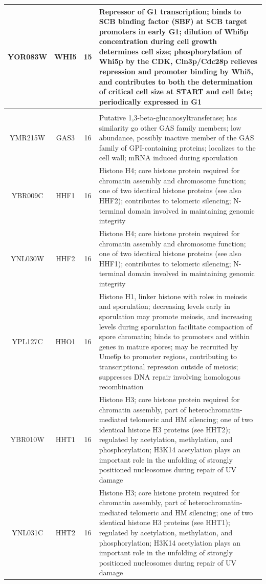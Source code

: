 \documentclass[]{article}
\begin{document}
\begin{longtable}{@{\extracolsep{3pt}} cccp{85mm}}
YOR083W & WHI5 & 15 & Repressor of G1 transcription; binds to SCB binding factor (SBF) at SCB target promoters in early G1; dilution of Whi5p concentration during cell growth determines cell size; phosphorylation of Whi5p by the CDK, Cln3p/Cdc28p relieves repression and promoter binding by Whi5, and contributes to both the determination of critical cell size at START and cell fate; periodically expressed in G1 \\   \hline \\ [-1.8ex] 
YMR215W & GAS3 & 16 & Putative 1,3-beta-glucanosyltransferase; has similarity go other GAS family members; low abundance, possibly inactive member of the GAS family of GPI-containing proteins; localizes to the cell wall; mRNA induced during sporulation \\ 
YBR009C & HHF1 & 16 & Histone H4; core histone protein required for chromatin assembly and chromosome function; one of two identical histone proteins (see also HHF2); contributes to telomeric silencing; N-terminal domain involved in maintaining genomic integrity \\ 
YNL030W & HHF2 & 16 & Histone H4; core histone protein required for chromatin assembly and chromosome function; one of two identical histone proteins (see also HHF1); contributes to telomeric silencing; N-terminal domain involved in maintaining genomic integrity \\ 
YPL127C & HHO1 & 16 & Histone H1, linker histone with roles in meiosis and sporulation; decreasing levels early in sporulation may promote meiosis, and increasing levels during sporulation facilitate compaction of spore chromatin; binds to promoters and within genes in mature spores; may be recruited by Ume6p to promoter regions, contributing to transcriptional repression outside of meiosis; suppresses DNA repair involving homologous recombination \\ 
YBR010W & HHT1 & 16 & Histone H3; core histone protein required for chromatin assembly, part of heterochromatin-mediated telomeric and HM silencing; one of two identical histone H3 proteins (see HHT2); regulated by acetylation, methylation, and phosphorylation; H3K14 acetylation plays an important role in the unfolding of strongly positioned nucleosomes during repair of UV damage \\ 
YNL031C & HHT2 & 16 & Histone H3; core histone protein required for chromatin assembly, part of heterochromatin-mediated telomeric and HM silencing; one of two identical histone H3 proteins (see HHT1); regulated by acetylation, methylation, and phosphorylation; H3K14 acetylation plays an important role in the unfolding of strongly positioned nucleosomes during repair of UV damage \\ 

\end{longtable}
\end{document}
